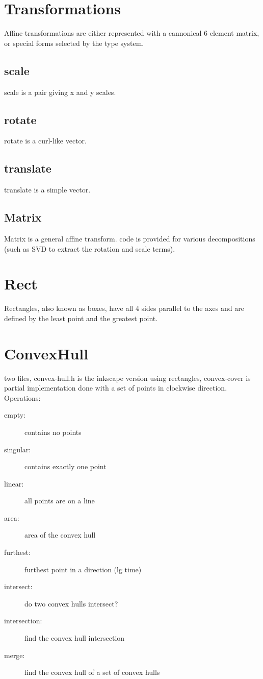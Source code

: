\section{Transformations}

Affine transformations are either represented with a cannonical 6
element matrix, or special forms selected by the type system.

\subsection{scale}

scale is a pair giving x and y scales.

\subsection{rotate}

rotate is a curl-like vector.

\subsection{translate}

translate is a simple vector.

\subsection{Matrix}

Matrix is a general affine transform.  code is provided for various
decompositions (such as SVD to extract the rotation and scale terms).

\section{Rect}

Rectangles, also known as boxes, have all 4 sides parallel to the axes
and are defined by the least point and the greatest point.

\section{ConvexHull}

two files, convex-hull.h is the inkscape version using rectangles,
convex-cover is partial implementation done with a set of points in
clockwise direction.  Operations:

\begin{description}
\item[empty:] contains no points
\item[singular:] contains exactly one point
\item[linear:] all points are on a line
\item[area:] area of the convex hull
\item[furthest:] furthest point in a direction (lg time)
\item[intersect:] do two convex hulls intersect?
\item[intersection:] find the convex hull intersection
\item[merge:] find the convex hull of a set of convex hulls
\end{description}

